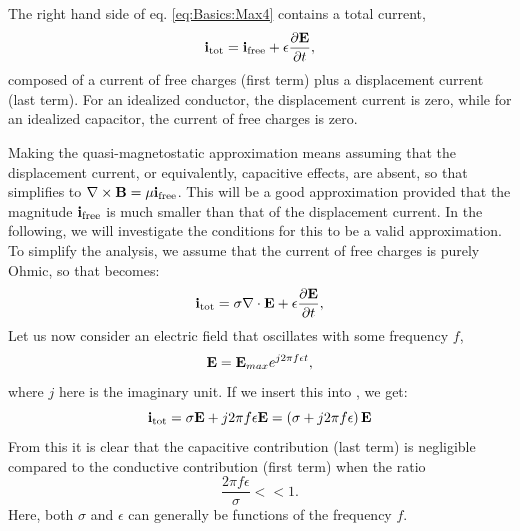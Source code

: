 \subsection{}
\label{sec:Basics:Quasimagnetostatic} 
The right hand side of eq. \ref{eq:Basics:Max4} contains a total current,
\begin{equation}
{\bf i}_\text{tot} = {\bf i}_\text{free} + \epsilon\frac{\partial {\bf E}}{\partial t}, 
\label{eq:Basics:totcurrent}
\end{equation}
composed of a current of free charges (first term) plus a displacement current (last term). For an idealized conductor, the displacement current is zero, while for an idealized capacitor, the current of free charges is zero. 

Making the quasi-magnetostatic approximation means assuming that the displacement current, or equivalently, capacitive effects, are absent, so that  simplifies to ${\bf \nabla} \times {\bf B}  =  \mu{\bf i}_\text{free}$. This will be a good approximation provided that the magnitude ${\bf i}_\text{free}$ is much smaller than that of the displacement current. In the following, we will investigate the conditions for this to be a valid approximation. To simplify the analysis, we assume that the current of free charges is purely Ohmic, so that  becomes:
\begin{equation}
{\bf i}_\text{tot} = \sigma {\bf \nabla} \cdot {\bf E} + \epsilon\frac{\partial {\bf E}}{\partial t}, 
\label{eq:Basics:totcurrent2}
\end{equation}
Let us now consider an electric field that oscillates with some frequency $f$, 
\begin{equation}
{\bf E} = {\bf E}_{max} e^{j2\pi f \epsilon t}, 
\label{eq:Basics:Ecomponent}
\end{equation}
where $j$ here is the imaginary unit. If we insert this into , we get:
\begin{equation}
{\bf i}_\text{tot} = \sigma{\bf E} +  j 2 \pi f \epsilon {\bf E} = \left( \sigma + j 2 \pi f \epsilon \right){\bf E}
\label{eq:Basics:totcurrent3}
\end{equation}
From this it is clear that the capacitive contribution (last term) is negligible compared to the conductive contribution (first term) when the ratio
\begin{equation}
\frac{2 \pi f \epsilon}{\sigma} << 1. 
\label{eq:Basics:ratiocondition}
\end{equation}
Here, both $\sigma$ and $\epsilon$ can generally be functions of the frequency $f$. 

